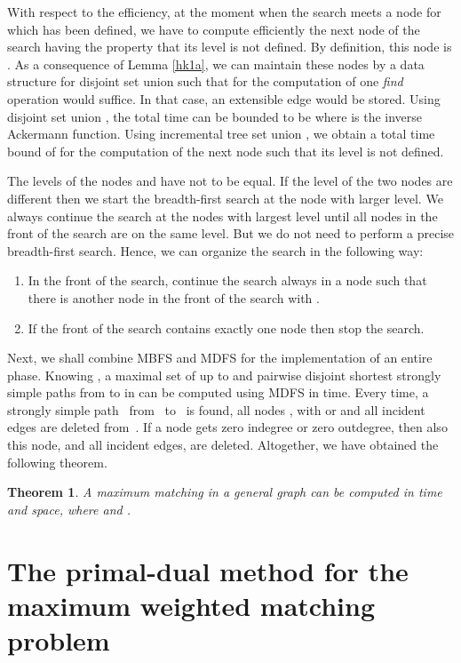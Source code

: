 \documentclass[12pt,twoside,a4paper]{article}
\newtheorem{theo}{Theorem}
\begin{document}
With respect to the efficiency, at the moment when the search meets a node
 for which  has been defined, we have to compute efficiently
the next node of the search having the property that its level is not defined. 
By definition, this node is . As a consequence of Lemma \ref{hk1a}, we can 
maintain these nodes by a data structure for disjoint set union such that for the computation 
of 
one {\em find\/} operation would suffice. In that case, an extensible edge would be stored.
Using disjoint set union \cite{Ta}, the total time can be bounded to be  
where  is the inverse Ackermann function. Using incremental tree set union 
\cite{GaTa}, we obtain a total time bound of  for the computation of 
the next node such that its level is not defined.

The levels of the nodes  and  have not to be equal. If the level of the 
two nodes are different then we start the breadth-first search at the node with 
larger level. We always continue the search at the nodes with largest level
until all nodes in the front of the search are on the same level. But we do not need
to perform a precise breadth-first search. Hence, we can organize the search in the following way:
\begin{enumerate}
\item
In the front of the search, continue the search always in a node  such that
there is another node  in the front of the search with .
\item
If the front of the search contains exactly one node then stop the search.
\end{enumerate}
Next, we shall combine MBFS and MDFS for the implementation of an entire phase.
Knowing , a maximal set of up to  and  pairwise disjoint shortest
strongly simple paths from  to  in  can be computed using MDFS in  
time. Every time, a strongly simple path~ from~ to~ is found, all
nodes ,  with  or  and all incident edges
are deleted from~. If a node gets zero indegree or zero
outdegree, then also this node, and all incident edges, are deleted.
Altogether, we have obtained the following theorem.

\begin{theo}
A maximum matching in a general graph  can be computed in
 time and  space, where 
 and .
\end{theo}

\section{The primal-dual method for the \\maximum weighted matching problem}
\end{document}
